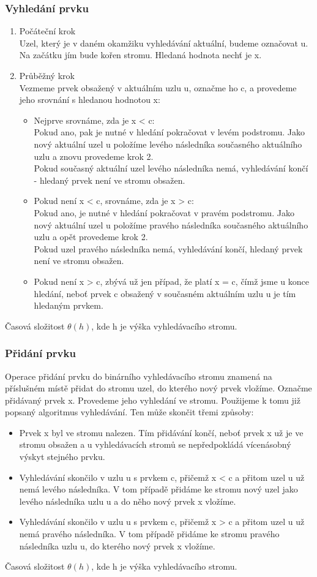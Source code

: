 \documentclass[10pt,a4paper]{article}
\begin{document}
\subsubsection{Vyhledání prvku}
\begin{enumerate}
	\item Počáteční krok \\
	Uzel, který je v daném okamžiku vyhledávání aktuální, budeme označovat u. Na začátku jím bude kořen stromu. Hledaná hodnota nechť je x.
	\item Průběžný krok \\
	Vezmeme prvek obsažený v aktuálním uzlu u, označme ho c, a provedeme jeho srovnání s hledanou hodnotou x:
	\begin{itemize}
		\item Nejprve srovnáme, zda je x < c: \\
		Pokud ano, pak je nutné v hledání pokračovat v levém podstromu. Jako nový aktuální uzel u položíme levého následníka současného aktuálního uzlu a znovu provedeme krok 2. \\
		Pokud současný aktuální uzel levého následníka nemá, vyhledávání končí - hledaný prvek není ve stromu obsažen.
		\item Pokud není x < c, srovnáme, zda je x > c: \\
		Pokud ano, je nutné v hledání pokračovat v pravém podstromu. Jako nový aktuální uzel u položíme pravého následníka současného aktuálního uzlu a opět provedeme krok 2. \\
		Pokud uzel pravého následníka nemá, vyhledávání končí, hledaný prvek není ve stromu obsažen.
		\item Pokud není x > c, zbývá už jen případ, že platí x = c, čímž jsme u konce hledání, neboť prvek c obsažený v současném aktuálním uzlu u je tím hledaným prvkem.
	\end{itemize}
\end{enumerate}
Časová složitost $\theta(h)$, kde h je výška vyhledávacího stromu.
\subsubsection{Přidání prvku}
Operace přidání prvku do binárního vyhledávacího stromu znamená na příslušném místě přidat do stromu uzel, do kterého nový prvek vložíme. Označme přidávaný prvek x. Provedeme jeho vyhledání ve stromu. Použijeme k tomu již popsaný algoritmus vyhledávání. Ten může skončit třemi způsoby:
\begin{itemize}
	\item Prvek x byl ve stromu nalezen. Tím přidávání končí, neboť prvek x už je ve stromu obsažen a u vyhledávacích stromů se nepředpokládá vícenásobný výskyt stejného prvku.
 	\item Vyhledávání skončilo v uzlu u s prvkem c, přičemž x < c a přitom uzel u už nemá levého následníka. V tom případě přidáme ke stromu nový uzel jako levého následníka uzlu u a do něho nový prvek x vložíme.
	\item Vyhledávání skončilo v uzlu u s prvkem c, přičemž x > c a přitom uzel u už nemá pravého následníka. V tom případě přidáme ke stromu pravého následníka uzlu u, do kterého nový prvek x vložíme.
\end{itemize}
Časová složitost $\theta(h)$, kde h je výška vyhledávacího stromu.
\end{document}
